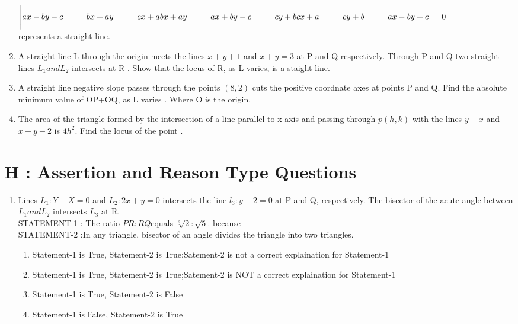 \documentclass[12pt]{article}
\begin{document}
\begin{enumerate}
$\Bigg |ax-by-c\hspace{1cm}bx+ay\hspace{1cm} cx+a\\
bx+ay  \hspace{1cm}ax+by-c  \hspace{1cm}cy+b\\
cx+a   \hspace{1cm} cy+b  \hspace{1cm}  ax-by+c\Bigg |$ =0\\
represents a straight line.\\
\item A straight line L through the origin meets the lines $x+y+1$ and $x+y=3$ at P and Q respectively. Through  P and Q two straight lines $L_1 and L_2$ intersects at R . Show that the locus of R, as L varies, is a staight line.\\
\item A straight line negative slope passes through the points $(8,2)$ cuts the positive coordnate axes at points P and Q. Find the absolute minimum value of OP+OQ, as L varies . Where O is the origin.\\
\item The area of the triangle formed by the intersection of a line parallel to x-axis and passing through $p(h,k)$ with the lines $y-x$ and $x+y-2$ is $4h^2$. Find the locus of the point .\\
\end{enumerate}

\section*{H   : Assertion and Reason Type Questions}

\begin{enumerate}

\item Lines $L_1: Y-X=0$ and $L_2 :2x+y=0$ intersects the line $l_3:y+2=0$ at P and Q, respectively. The bisector of the acute angle between $L_1 and L_2$ intersects $L_3$ at R.\\
STATEMENT-1 : The ratio $PR:RQ$equals $\sqrt[2]{2}:\sqrt{5}$. because \\
STATEMENT-2 :In any triangle, bisector of an angle divides the triangle into two triangles.
\begin{enumerate}
\item Statement-1 is True, Statement-2 is True;Satement-2 is not a correct explaination for Statement-1
\item Statement-1 is True, Statement-2 is True;Satement-2 is NOT a correct explaination for Statement-1
\item Statement-1 is True, Statement-2 is False
\item Statement-1 is False, Statement-2 is True
\end{enumerate}
\end{enumerate}
\end{document}
